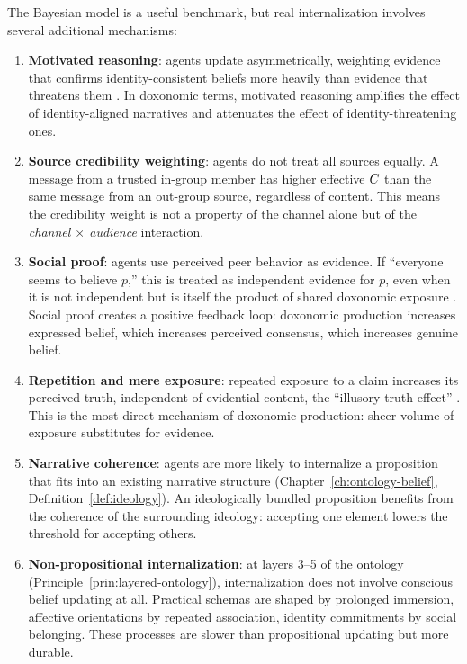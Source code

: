 The Bayesian model is a useful benchmark, but real internalization involves several additional mechanisms:

\begin{enumerate}[nosep]
  \item \textbf{Motivated reasoning}: agents update asymmetrically, weighting evidence that confirms identity-consistent beliefs more heavily than evidence that threatens them \autocite{kahan2012}.
  In doxonomic terms, motivated reasoning amplifies the effect of identity-aligned narratives and attenuates the effect of identity-threatening ones.

  \item \textbf{Source credibility weighting}: agents do not treat all sources equally.
  A message from a trusted in-group member has higher effective $C_{}$ than the same message from an out-group source, regardless of content.
  This means the credibility weight is not a property of the channel alone but of the \emph{channel $\times$ audience} interaction.

  \item \textbf{Social proof}: agents use perceived peer behavior as evidence.
  If ``everyone seems to believe $p$,'' this is treated as independent evidence for $p$, even when it is not independent but is itself the product of shared doxonomic exposure \autocite{cialdini2006}.
  Social proof creates a positive feedback loop: doxonomic production increases expressed belief, which increases perceived consensus, which increases genuine belief.

  \item \textbf{Repetition and mere exposure}: repeated exposure to a claim increases its perceived truth, independent of evidential content, the ``illusory truth effect'' \autocite{kahneman2011}.
  This is the most direct mechanism of doxonomic production: sheer volume of exposure substitutes for evidence.

  \item \textbf{Narrative coherence}: agents are more likely to internalize a proposition that fits into an existing narrative structure (Chapter~\ref{ch:ontology-belief}, Definition~\ref{def:ideology}).
  An ideologically bundled proposition benefits from the coherence of the surrounding ideology: accepting one element lowers the threshold for accepting others.

  \item \textbf{Non-propositional internalization}: at layers 3--5 of the ontology (Principle~\ref{prin:layered-ontology}), internalization does not involve conscious belief updating at all.
  Practical schemas are shaped by prolonged immersion, affective orientations by repeated association, identity commitments by social belonging.
  These processes are slower than propositional updating but more durable.
\end{enumerate}

